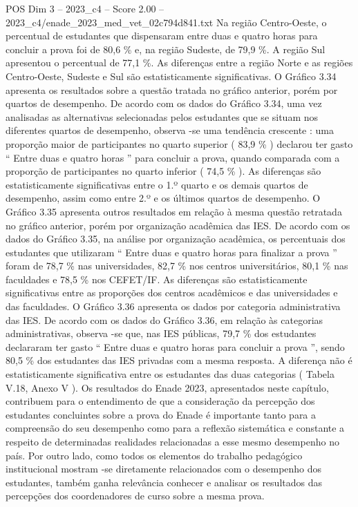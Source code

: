\begin{textsample}{POS Dim 3 – 2023\_c4 – Score 2.00 – 2023\_c4/enade\_2023\_med\_vet\_02c794d841.txt}
Na região Centro-Oeste, o percentual de estudantes que dispensaram entre duas e quatro horas para concluir a prova foi de 80,6 \% e, na região Sudeste, de 79,9 \%.
A região Sul apresentou o percentual de 77,1 \%.
As diferenças entre a região Norte e as regiões Centro-Oeste, Sudeste e Sul são estatisticamente significativas.
O Gráfico 3.34 apresenta os resultados sobre a questão tratada no gráfico anterior, porém por quartos de desempenho.
De acordo com os dados do Gráfico 3.34, uma vez analisadas as alternativas selecionadas pelos estudantes que se situam nos diferentes quartos de desempenho, observa -se uma tendência crescente : uma proporção maior de participantes no quarto superior ( 83,9 \% ) declarou ter gasto “ Entre duas e quatro horas ” para concluir a prova, quando comparada com a proporção de participantes no quarto inferior ( 74,5 \% ).
As diferenças são estatisticamente significativas entre o 1.º quarto e os demais quartos de desempenho, assim como entre 2.º e os últimos quartos de desempenho.
O Gráfico 3.35 apresenta outros resultados em relação à mesma questão retratada no gráfico anterior, porém por organização acadêmica das IES.
De acordo com os dados do Gráfico 3.35, na análise por organização acadêmica, os percentuais dos estudantes que utilizaram “ Entre duas e quatro horas para finalizar a prova ” foram de 78,7 \% nas universidades, 82,7 \% nos centros universitários, 80,1 \% nas faculdades e 78,5 \% nos CEFET/IF.
As diferenças são estatisticamente significativas entre as proporções dos centros acadêmicos e das universidades e das faculdades.
O Gráfico 3.36 apresenta os dados por categoria administrativa das IES.
De acordo com os dados do Gráfico 3.36, em relação às categorias administrativas, observa -se que, nas IES públicas, 79,7 \% dos estudantes declararam ter gasto “ Entre duas e quatro horas para concluir a prova ”, sendo 80,5 \% dos estudantes das IES privadas com a mesma resposta.
A diferença não é estatisticamente significativa entre os estudantes das duas categorias ( Tabela V.18, Anexo V ).
Os resultados do Enade 2023, apresentados neste capítulo, contribuem para o entendimento de que a consideração da percepção dos estudantes concluintes sobre a prova do Enade é importante tanto para a compreensão do seu desempenho como para a reflexão sistemática e constante a respeito de determinadas realidades relacionadas a esse mesmo desempenho no país.
Por outro lado, como todos os elementos do trabalho pedagógico institucional mostram -se diretamente relacionados com o desempenho dos estudantes, também ganha relevância conhecer e analisar os resultados das percepções dos coordenadores de curso sobre a mesma prova.

\end{textsample}
